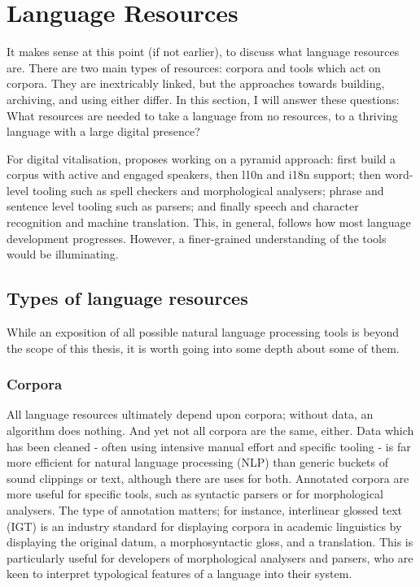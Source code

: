 \section{Language Resources}
\label{sec:resources}

It makes sense at this point (if not earlier), to discuss what language resources are. There are two main types of resources: corpora and tools which act on corpora. They are inextricably linked, but the approaches towards building, archiving, and using either differ. In this section, I will answer these questions: What resources are needed to take a language from no resources, to a thriving language with a large digital presence?

For digital vitalisation, \citet{kornai2015new} proposes working on a pyramid approach: first build a corpus with active and engaged speakers, then l10n and i18n support; then word-level tooling such as spell checkers and morphological analysers; phrase and sentence level tooling such as parsers; and finally speech and character recognition and machine translation. This, in general, follows how most language development progresses. However, a finer-grained understanding of the tools would be illuminating.

\subsection{Types of language resources}

While an exposition of all possible natural language processing tools is beyond the scope of this thesis, it is worth going into some depth about some of them.

\subsubsection{Corpora}

All language resources ultimately depend upon corpora; without data, an algorithm does nothing. And yet not all corpora are the same, either. Data which has been cleaned - often using intensive manual effort and specific tooling - is far more efficient for natural language processing (NLP)  than generic buckets of sound clippings or text, although there are uses for both. Annotated corpora are more useful for specific tools, such as syntactic parsers or for morphological analysers. The type of annotation matters; for instance, interlinear glossed text (IGT) is an industry standard for displaying corpora in academic linguistics by displaying the original datum, a morphosyntactic gloss, and a translation. This is particularly useful for developers of morphological analysers and parsers, who are keen to interpret typological features of a language into their system.

